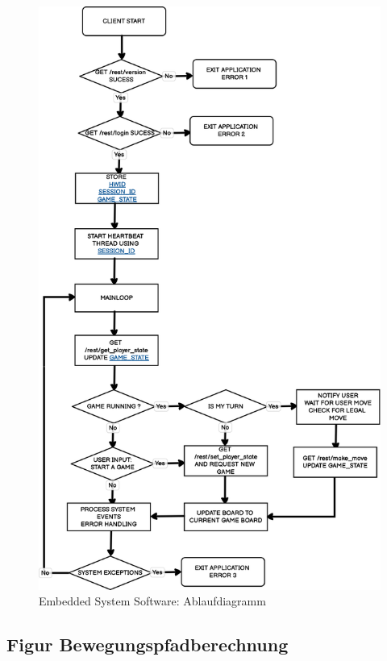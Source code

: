 \begin{figure}
\centering
\includegraphics{images/ATC_gameclient_statemachiene.png}
\caption{Embedded System Software: Ablaufdiagramm
\label{ATC_gameclient_statemachiene}}
\end{figure}

\hypertarget{figur-bewegungspfadberechnung}{%
\subsection{Figur
Bewegungspfadberechnung}\label{figur-bewegungspfadberechnung}}

